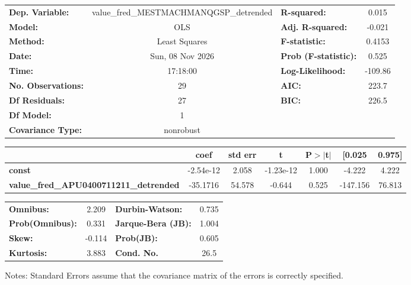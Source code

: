 \begin{center}
\begin{tabular}{lclc}
\toprule
\textbf{Dep. Variable:}                        & value\_fred\_MESTMACHMANQGSP\_detrended & \textbf{  R-squared:         } &     0.015   \\
\textbf{Model:}                                &                   OLS                   & \textbf{  Adj. R-squared:    } &    -0.021   \\
\textbf{Method:}                               &              Least Squares              & \textbf{  F-statistic:       } &    0.4153   \\
\textbf{Date:}                                 &             Sun, 08 Nov 2026            & \textbf{  Prob (F-statistic):} &    0.525    \\
\textbf{Time:}                                 &                 17:18:00                & \textbf{  Log-Likelihood:    } &   -109.86   \\
\textbf{No. Observations:}                     &                      29                 & \textbf{  AIC:               } &     223.7   \\
\textbf{Df Residuals:}                         &                      27                 & \textbf{  BIC:               } &     226.5   \\
\textbf{Df Model:}                             &                       1                 & \textbf{                     } &             \\
\textbf{Covariance Type:}                      &                nonrobust                & \textbf{                     } &             \\
\bottomrule
\end{tabular}
\begin{tabular}{lcccccc}
                                               & \textbf{coef} & \textbf{std err} & \textbf{t} & \textbf{P$> |$t$|$} & \textbf{[0.025} & \textbf{0.975]}  \\
\midrule
\textbf{const}                                 &    -2.54e-12  &        2.058     & -1.23e-12  &         1.000        &       -4.222    &        4.222     \\
\textbf{value\_fred\_APU0400711211\_detrended} &     -35.1716  &       54.578     &    -0.644  &         0.525        &     -147.156    &       76.813     \\
\bottomrule
\end{tabular}
\begin{tabular}{lclc}
\textbf{Omnibus:}       &  2.209 & \textbf{  Durbin-Watson:     } &    0.735  \\
\textbf{Prob(Omnibus):} &  0.331 & \textbf{  Jarque-Bera (JB):  } &    1.004  \\
\textbf{Skew:}          & -0.114 & \textbf{  Prob(JB):          } &    0.605  \\
\textbf{Kurtosis:}      &  3.883 & \textbf{  Cond. No.          } &     26.5  \\
\bottomrule
\end{tabular}
\end{center}

Notes: \newline
 [1] Standard Errors assume that the covariance matrix of the errors is correctly specified.